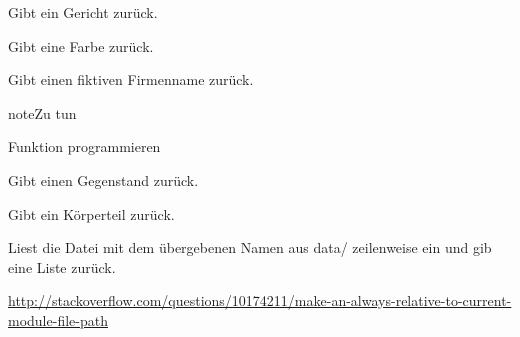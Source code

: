 \documentclass[a4paper,12pt,oneside]{sphinxmanual}
\begin{document}

\begin{fulllineitems}
\label{funktionen:pyzufall.essen}
Gibt ein Gericht zurück.

\end{fulllineitems}


\begin{fulllineitems}
\label{funktionen:pyzufall.farbe}
Gibt eine Farbe zurück.

\end{fulllineitems}


\begin{fulllineitems}
\label{funktionen:pyzufall.firma}
Gibt einen fiktiven Firmenname zurück.

\begin{notice}{note}{Zu tun}

Funktion programmieren
\end{notice}

\end{fulllineitems}


\begin{fulllineitems}
\label{funktionen:pyzufall.gegenstand}
Gibt einen Gegenstand zurück.

\end{fulllineitems}


\begin{fulllineitems}
\label{funktionen:pyzufall.koerperteil}
Gibt ein Körperteil zurück.

\end{fulllineitems}


\begin{fulllineitems}
\label{funktionen:pyzufall.lese}
Liest die Datei mit dem übergebenen Namen aus data/ zeilenweise ein und gib eine Liste zurück.

\href{http://stackoverflow.com/questions/10174211/make-an-always-relative-to-current-module-file-path}{http://stackoverflow.com/questions/10174211/make-an-always-relative-to-current-module-file-path}

\end{fulllineitems}
\end{document}
